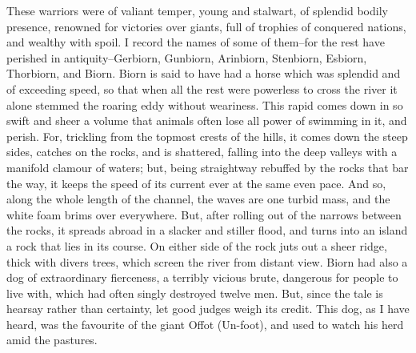 \documentclass[10pt,a4paper]{report}
\begin{document}
These warriors were of valiant temper, young and stalwart, of splendid bodily presence, renowned for victories over giants, full of trophies of conquered nations, and wealthy with spoil. I record the names of some of them--for the rest have perished in antiquity--Gerbiorn, Gunbiorn, Arinbiorn, Stenbiorn, Esbiorn, Thorbiorn, and Biorn. Biorn is said to have had a horse which was splendid and of exceeding speed, so that when all the rest were powerless to cross the river it alone stemmed the roaring eddy without weariness. This rapid comes down in so swift and sheer a volume that animals often lose all power of swimming in it, and perish. For, trickling from the topmost crests of the hills, it comes down the steep sides, catches on the rocks, and is shattered, falling into the deep valleys with a manifold clamour of waters; but, being straightway rebuffed by the rocks that bar the way, it keeps the speed of its current ever at the same even pace. And so, along the whole length of the channel, the waves are one turbid mass, and the white foam brims over everywhere. But, after rolling out of the narrows between the rocks, it spreads abroad in a slacker and stiller flood, and turns into an island a rock that lies in its course. On either side of the rock juts out a sheer ridge, thick with divers trees, which screen the river from distant view. Biorn had also a dog of extraordinary fierceness, a terribly vicious brute, dangerous for people to live with, which had often singly destroyed twelve men. But, since the tale is hearsay rather than certainty, let good judges weigh its credit. This dog, as I have heard, was the favourite of the giant Offot (Un-foot), and used to watch his herd amid the pastures.\\
\end{document}
